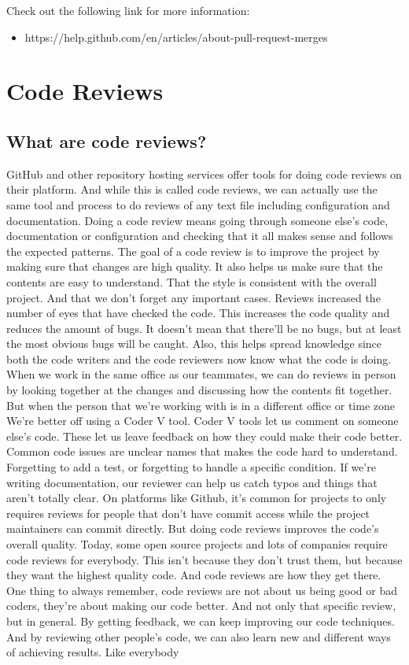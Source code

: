	Check out the following link for more information:
	\begin{itemize}
		\item https://help.github.com/en/articles/about-pull-request-merges
	\end{itemize}
	

\section{Code Reviews}

	\subsection{What are code reviews?}
	
	GitHub and other repository hosting services offer tools for doing code reviews on their platform. And while this is called code reviews, we can actually use the same tool and process to do reviews of any text file including configuration and documentation. Doing a code review means going through someone else's code, documentation or configuration and checking that it all makes sense and follows the expected patterns. The goal of a code review is to improve the project by making sure that changes are high quality. It also helps us make sure that the contents are easy to understand. That the style is consistent with the overall project. And that we don't forget any important cases. Reviews increased the number of eyes that have checked the code. This increases the code quality and reduces the amount of bugs. It doesn't mean that there'll be no bugs, but at least the most obvious bugs will be caught. Also, this helps spread knowledge since both the code writers and the code reviewers now know what the code is doing. When we work in the same office as our teammates, we can do reviews in person by looking together at the changes and discussing how the contents fit together. But when the person that we're working with is in a different office or time zone We're better off using a Coder V tool. Coder V tools let us comment on someone else's code. These let us leave feedback on how they could make their code better. Common code issues are unclear names that makes the code hard to understand. Forgetting to add a test, or forgetting to handle a specific condition. If we're writing documentation, our reviewer can help us catch typos and things that aren't totally clear. On platforms like Github, it's common for projects to only requires reviews for people that don't have commit access while the project maintainers can commit directly. But doing code reviews improves the code's overall quality. Today, some open source projects and lots of companies require code reviews for everybody. This isn't because they don't trust them, but because they want the highest quality code. And code reviews are how they get there. One thing to always remember, code reviews are not about us being good or bad coders, they're about making our code better. And not only that specific review, but in general. By getting feedback, we can keep improving our code techniques. And by reviewing other people's code, we can also learn new and different ways of achieving results. Like everybody 